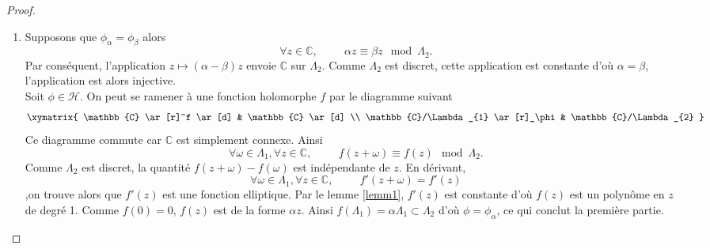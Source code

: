 \documentclass[a4paper]{article}
\begin{document}
\begin{proof}
\begin{enumerate}
\item
Supposons que $\phi_{\alpha}=\phi_{\beta}$ alors
\begin{equation*}
 \forall z \in \mathbb{C}, \hspace{1cm} \alpha z \equiv \beta z \mod \Lambda_{2}.
\end{equation*}
Par conséquent, l'application $z \mapsto (\alpha-\beta)z$ envoie $\mathbb{C}$ sur $\Lambda_{2}$. Comme $\Lambda_{2}$ est discret, cette application est constante d'où $\alpha=\beta$, l'application est alors injective. \\
Soit $\phi \in \mathcal{H}$.
On peut se ramener à une fonction holomorphe $f$ par le diagramme suivant
\begin{equation*}
\xymatrix{
    \mathbb{C} \ar[r]^f \ar[d] & \mathbb{C} \ar[d] \\
    \mathbb{C}/\Lambda_{1} \ar[r]_\phi & \mathbb{C}/\Lambda_{2}
  }
\end{equation*}
Ce diagramme commute car $\mathbb{C}$ est simplement connexe.
Ainsi 
\begin{equation*}
 \forall \omega \in \Lambda_{1}, \forall z \in \mathbb{C}, \hspace{1cm} f(z+\omega) \equiv f(z) \mod \Lambda_{2}.
\end{equation*}
Comme $\Lambda_{2}$ est discret, la quantité $f(z+\omega)-f(\omega)$ est indépendante de $z$. En dérivant,
\begin{equation*}
\forall \omega \in \Lambda_{1}, \forall z \in \mathbb{C}, \hspace{1cm} f'(z+\omega) = f'(z)
\end{equation*}
,on trouve alors que $f'(z)$ est une fonction elliptique. Par le lemme \ref{lemm1}, $f'(z)$ est constante d'où $f(z)$ est un polynôme en $z$ de degré 1. Comme $f(0)=0$, $f(z)$ est de la forme $\alpha z$. Ainsi $f(\Lambda_{1})=\alpha\Lambda_{1} \subset \Lambda_{2}$ d'où $\phi=\phi_{\alpha}$, ce qui conclut la première partie.


\end{enumerate}
\end{proof}
\end{document}
